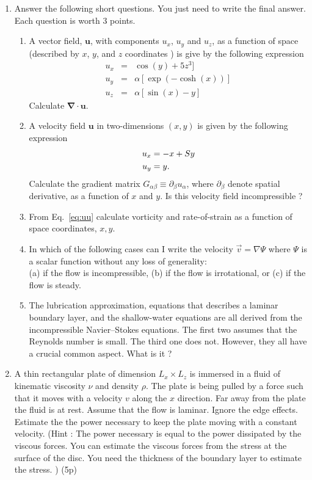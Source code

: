 \documentclass[12pt,a4paper]{article}
\def \uu  {\bm{u}}
\def \dive {\bm{\nabla}\cdot}
\newcommand{\bu}{\bm{u}}
\begin{document}
\begin{enumerate}

\item \label{prb1} Answer the following short questions. You just need to write the final answer. Each question is worth 3 points. 
  \begin{enumerate}
  \item A vector field, $\bu$, with components $u_x$, $u_y$ and $u_z$,  as a function  of
    space (described by $x$, $y$, and $z$ coordinates )
    is give by the following expression
    \begin{eqnarray}
      u_x &=& \cos(y) + 5z^3 ] \nonumber \\
      u_y &=& \alpha[ \exp(-\cosh(x)) ] \nonumber \\
      u_z &=& \alpha[ \sin(x) -y ]
    \end{eqnarray}
   Calculate $\dive \uu$. 
 \item A velocity field $\bu$ in two-dimensions $(x,y)$ is given by the following expression
   \begin{subequations}
     \begin{align}
     u_x &= -x + Sy \\
     u_y &= y  \/.
     \end{align}
     \label{eq:uu}
   \end{subequations}
   Calculate the gradient matrix $ G_{\alpha\beta} \equiv \partial_{\beta}u_{\alpha}$, where
   $\partial_{\beta}$ denote spatial derivative, as a function of $x$ and $y$. Is this velocity
   field incompressible ? 
 \item From Eq.~\ref{eq:uu}  calculate vorticity and rate-of-strain as a function of
   space coordinates, $x,y$.
  \item In which of the following cases can I write the velocity $\vec{v} = \nabla \Psi $ where $\Psi$ is a scalar function
    without any loss of generality: \\
    (a) if the flow is incompressible, (b) if the flow is irrotational, or (c) if the flow is steady.
  \item The lubrication approximation, equations that describes a laminar boundary layer, 
and the
    shallow-water equations are all derived
    from the incompressible Navier--Stokes equations.
The first two assumes that the Reynolds number is small. The third one does not. 
However, they all have a crucial common aspect. What is it ?   
    \end{enumerate}

\item \label{prb3} A thin rectangular plate of dimension $L_x\times L_z$ 
is immersed in a fluid  of
kinematic viscosity $\nu$ and density $\rho$. The plate is being
pulled by a force such that it moves with a velocity $v$ along the $x$
direction. Far away from the plate the fluid is at rest. Assume that the flow is
  laminar. Ignore the edge effects. 
  Estimate the the power necessary to keep the plate moving with a constant velocity.
    (Hint : The power necessary
    is equal to the power dissipated by the viscous forces. You can estimate the
    viscous forces from the stress at the surface of the disc. You need the thickness
    of the boundary layer to estimate the stress. ) (5p)


\end{enumerate}
\end{document}
